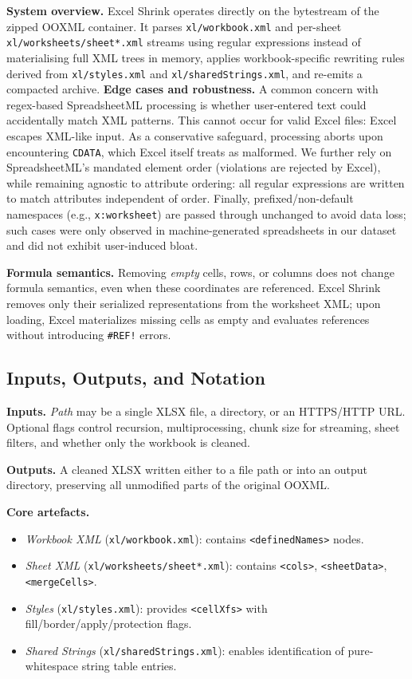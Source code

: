 \documentclass[conference]{IEEEtran}
\begin{document}
\textbf{System overview.}
Excel Shrink operates directly on the bytestream of the zipped OOXML container.
It parses \texttt{xl/workbook.xml} and per-sheet
\texttt{xl/worksheets/sheet*.xml} streams using regular expressions
instead of materialising full XML trees in memory,
applies workbook-specific rewriting rules derived from
\texttt{xl/styles.xml} and \texttt{xl/sharedStrings.xml},
and re-emits a compacted archive.
\textbf{Edge cases and robustness.}
A common concern with regex-based SpreadsheetML processing is whether
user-entered text could accidentally match XML patterns.
This cannot occur for valid Excel files: Excel escapes XML-like input.
As a conservative safeguard, processing aborts upon encountering
\texttt{CDATA}, which Excel itself treats as malformed.
We further rely on SpreadsheetML’s mandated element order
(violations are rejected by Excel),
while remaining agnostic to attribute ordering:
all regular expressions are written to match attributes independent of order.
Finally, prefixed/non-default namespaces (e.g., \texttt{x:worksheet}) are passed through unchanged to avoid data loss; such cases were only observed in machine-generated spreadsheets in our dataset and did not exhibit user-induced bloat.

\textbf{Formula semantics.}
Removing \emph{empty} cells, rows, or columns does not change formula semantics,
even when these coordinates are referenced.
Excel Shrink removes only their serialized representations from the worksheet XML;
upon loading, Excel materializes missing cells as empty
and evaluates references without introducing \texttt{\#REF!} errors.


\subsection{Inputs, Outputs, and Notation}

\textbf{Inputs.}
\emph{Path} may be a single XLSX file, a directory, or an HTTPS/HTTP URL. Optional flags control recursion, multiprocessing, chunk size for streaming, sheet filters, and whether only the workbook is cleaned.

\textbf{Outputs.}
A cleaned XLSX written either to a file path or into an output directory, preserving all unmodified parts of the original OOXML.

\textbf{Core artefacts.}
\begin{itemize}
\item \emph{Workbook XML} (\texttt{xl/workbook.xml}): contains \texttt{<definedNames>} nodes.
\item \emph{Sheet XML} (\texttt{xl/worksheets/sheet*.xml}): contains \texttt{<cols>}, \texttt{<sheetData>}, \texttt{<mergeCells>}.
\item \emph{Styles} (\texttt{xl/styles.xml}): provides \texttt{<cellXfs>} with fill/border/apply/protection flags.
\item \emph{Shared Strings} (\texttt{xl/sharedStrings.xml}): enables identification of pure-whitespace string table entries.
\end{itemize}
\end{document}
